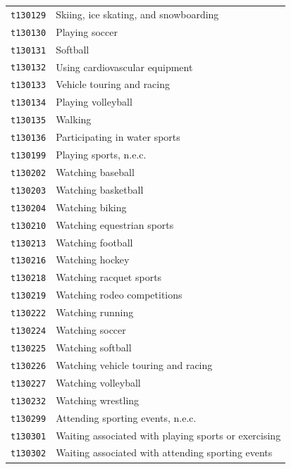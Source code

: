 \documentclass[11pt, a4paper]{article}
\begin{document}
\begin{longtable}{L{3cm} L{13cm}}
\texttt{t130129} & Skiing, ice skating, and snowboarding \\
 \texttt{t130130} & Playing soccer \\
\texttt{t130131} & Softball \\
 \texttt{t130132} & Using cardiovascular equipment \\
\texttt{t130133} & Vehicle touring and racing \\
 \texttt{t130134} & Playing volleyball \\
\texttt{t130135} & Walking \\
 \texttt{t130136} & Participating in water sports \\
\texttt{t130199} & Playing sports, n.e.c. \\
 \texttt{t130202} & Watching baseball \\
\texttt{t130203} & Watching basketball \\
 \texttt{t130204} & Watching biking \\
\texttt{t130210} & Watching equestrian sports \\
 \texttt{t130213} & Watching football \\
\texttt{t130216} & Watching hockey \\
 \texttt{t130218} & Watching racquet sports \\
\texttt{t130219} & Watching rodeo competitions \\
 \texttt{t130222} & Watching running \\
\texttt{t130224} & Watching soccer \\
 \texttt{t130225} & Watching softball \\
\texttt{t130226} & Watching vehicle touring and racing \\
 \texttt{t130227} & Watching volleyball \\
\texttt{t130232} & Watching wrestling \\
 \texttt{t130299} & Attending sporting events, n.e.c. \\
\texttt{t130301} & Waiting associated with playing sports or exercising \\
 \texttt{t130302} & Waiting associated with attending sporting events \\
\end{longtable}
\end{document}
